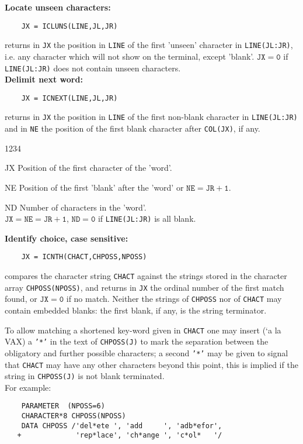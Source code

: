 {\bf Locate unseen characters:}
\begin{verbatim}
    JX = ICLUNS(LINE,JL,JR)
\end{verbatim}
returns in {\tt JX} the position in {\tt LINE} of the first
'unseen' character in {\tt LINE(JL:JR)}, i.e. any character which
will not show on the terminal, except 'blank'.
$\mathtt{JX=0}$ if {\tt LINE(JL:JR)} does not contain unseen
characters. \\[2mm]
\newpage
{\bf Delimit next word:}
\begin{verbatim}
    JX = ICNEXT(LINE,JL,JR)
\end{verbatim}
returns in {\tt JX} the position in {\tt LINE} of the first non-blank
character in {\tt LINE(JL:JR)} and in {\tt NE} the position of the first
blank character after {\tt COL(JX)}, if any.
\begin{DLtt}{1234}
\item[JX] Position of the first character of the 'word'.
\item[NE] Position of the first 'blank' after the 'word' or
$\mathtt{NE=JR+1}$.
\item[ND] Number of characters in the 'word'. \\
$\mathtt{JX=NE=JR+1}$, $\mathtt{ND=0}$  if {\tt LINE(JL:JR)}
is all blank.
\end{DLtt}
{\bf Identify choice, case sensitive:}
\begin{verbatim}
    JX = ICNTH(CHACT,CHPOSS,NPOSS)
\end{verbatim}
compares the character string {\tt CHACT} against the strings
stored in the character array {\tt CHPOSS(NPOSS)},
and returns in {\tt JX} the ordinal number of the first match found,
or $\mathtt{JX=0}$ if no match.
Neither the strings of {\tt CHPOSS} nor of {\tt CHACT}
may contain embedded blanks: the first blank, if any,
is the string terminator.
\par
To allow matching a shortened key-word given in {\tt CHACT}
one may insert (\a`a la VAX) a {\tt '*'} in the text of
{\tt CHPOSS(J)} to mark the separation between the obligatory
and further possible characters;
a second {\tt '*'} may be given to signal that {\tt CHACT}
may have any other characters beyond this point,
this is implied if the string in {\tt CHPOSS(J)} is
not blank terminated. \\
For example:
\begin{verbatim}
    PARAMETER  (NPOSS=6)
    CHARACTER*8 CHPOSS(NPOSS)
    DATA CHPOSS /'del*ete ', 'add     ', 'adb*efor',
   +             'rep*lace', 'ch*ange ', 'c*ol*   '/
\end{verbatim}
